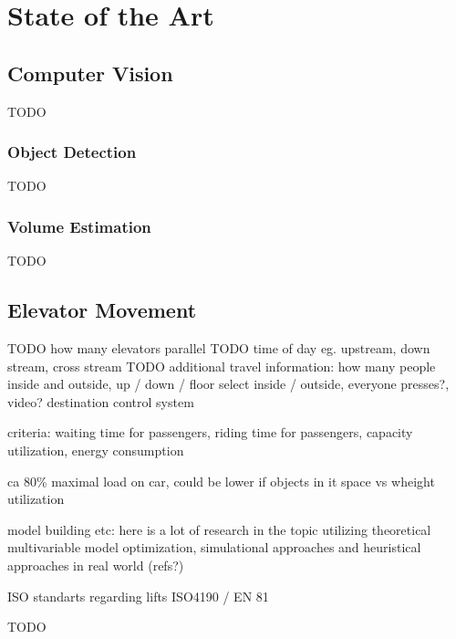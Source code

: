 \chapter{State of the Art}
\label{chap:sota}

\section{Computer Vision}

TODO

\subsection{Object Detection}

TODO

\subsection{Volume Estimation}

TODO

\section{Elevator Movement}
TODO how many elevators parallel
TODO time of day eg. upstream, down stream, cross stream
TODO additional travel information: how many people inside and outside, up / down / floor select inside / outside, everyone presses?, video? 
destination control system

criteria: waiting time for passengers, riding time for passengers, capacity utilization, energy consumption

ca 80\% maximal load on car, could be lower if objects in it
space vs wheight utilization

model building etc: here is a lot of research in the topic utilizing theoretical multivariable model optimization, simulational approaches and heuristical approaches in real world (refs?)

ISO standarts regarding lifts ISO4190 / EN 81

TODO
